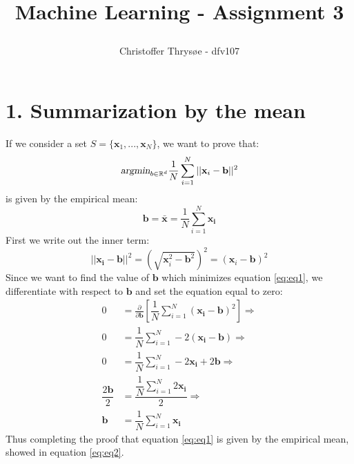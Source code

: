 \documentclass{article}
\title{
\vspace{1in}
\textmd{\textbf{Machine Learning - Assignment 3}} \\
\author{Christoffer Thrysøe - dfv107}
}
\begin{document}
\maketitle
{}
\section{1. Summarization by the mean}
If we consider a set $S = \lbrace \mathbf{x}_1,...,\mathbf{x}_N \rbrace $, we want to prove that:
\begin{equation}
\textsl{argmin}_{b \in \mathbb{R}^d} \dfrac{1}{N} \sum\limits_{i=1}^N ||\mathbf{x}_i-\mathbf{b}||^2
\label{eq:eq1}
\end{equation} 
is given by the empirical mean:
\begin{equation}
\mathbf{b} = \bar{\mathbf{x}} = \dfrac{1}{N} \sum\limits_{i=1}^N \mathbf{x_i}
\label{eq:eq2}
\end{equation}
First we write out the inner term:
\begin{equation*}
||\mathbf{x_i}-\mathbf{b}||^2 = \left( \sqrt{\mathbf{x}_i^2-\mathbf{b}^2} \right) ^2 = \left(\mathbf{x}_i - \mathbf{b} \right)^2
\end{equation*}
Since we want to find the value of $\mathbf{b}$ which minimizes equation \ref{eq:eq1}, we differentiate with respect to $\mathbf{b}$ and set the equation equal to zero:
\begin{align*}
0 &= \frac{\partial}{\partial \mathbf{b}} \left[
\dfrac{1}{N} \sum\limits_{i=1}^N \left(\mathbf{x_i}-\mathbf{b}\right)^2
\right] \Rightarrow \\
0 &= \dfrac{1}{N} \sum\limits_{i=1}^N -2 \left(\mathbf{x_i}-\mathbf{b}\right) \Rightarrow \\
0 &= \dfrac{1}{N} \sum\limits_{i=1}^N -2\mathbf{x_i} + 2\mathbf{b} \Rightarrow \\
\dfrac{2\mathbf{b}}{2} &= \dfrac{\dfrac{1}{N} \sum\limits_{i=1}^N 2\mathbf{x_i}}{2} \Rightarrow \\
\mathbf{b} &= \dfrac{1}{N} \sum\limits_{i=1}^N \mathbf{x_i}
\end{align*}
Thus completing the proof that equation \ref{eq:eq1} is given by the empirical mean, showed in equation \ref{eq:eq2}.
\end{document}
